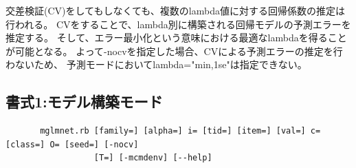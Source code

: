 交差検証(CV)をしてもしなくても、複数のlambda値に対する回帰係数の推定は行われる。
      CVをすることで、lambda別に構築される回帰モデルの予測エラーを推定する。
      そして、エラー最小化という意味における最適なlambdaを得ることが可能となる。
      よって-nocvを指定した場合、CVによる予測エラーの推定を行わないため、
      予測モードにおいてlambda="min,1se"は指定できない。


\subsection{書式1:モデル構築モード}
\begin{verbatim}
       mglmnet.rb [family=] [alpha=] i= [tid=] [item=] [val=] c= [class=] O= [seed=] [-nocv]
                  [T=] [-mcmdenv] [--help]
\end{verbatim}

